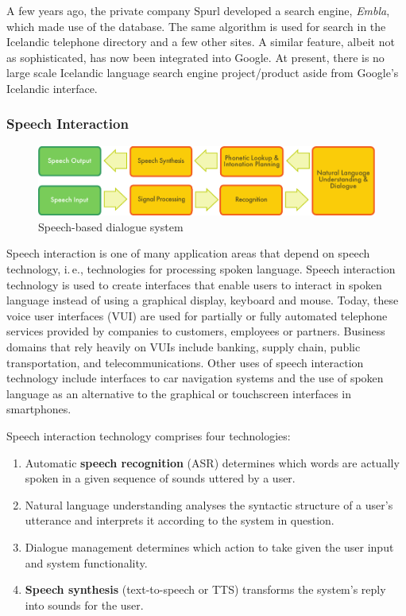 \begin{multicols}{2}
A few years ago, the private company Spurl developed a search engine, \textit{Embla}, which made use of the database. The same algorithm is used for search in the Icelandic telephone directory and a few other sites. A similar feature, albeit not as sophisticated, has now been integrated into Google. At present, there is no large scale Icelandic language search engine project/product aside from Google’s Icelandic interface.

\subsubsection{Speech Interaction}

\begin{figure}[t]
  \center
  \includegraphics[width=\textwidth]{../_media/english/simple_speech-based_dialogue_architecture}
  \caption{Speech-based dialogue system}
\label{fig:dialoguearch_en}
\end{figure}

Speech interaction is one of many application areas that depend on speech technology, i.\,e., technologies for processing spoken language. Speech interaction technology is used to create interfaces that enable users to interact in spoken language instead of using a graphical display, keyboard and mouse.  Today, these voice user interfaces (VUI) are used for partially or fully automated telephone services provided by companies to customers, employees or partners. Business domains that rely heavily on VUIs include banking, supply chain, public transportation, and telecommunications. Other uses of speech interaction technology include interfaces to car navigation systems and the use of spoken language as an alternative to the graphical or touchscreen interfaces in smartphones.

Speech interaction technology comprises four technologies: 

\begin{enumerate}
\item Automatic \textbf{speech recognition} (ASR) determines which words are actually spoken in a given sequence of sounds uttered by a user.  
\item Natural language understanding analyses the syntactic structure of a user’s utterance and interprets it according to the system in question.
\item Dialogue management determines which action to take given the user input and system functionality.   
\item \textbf{Speech synthesis} (text-to-speech or TTS) transforms the system’s reply into sounds for the user.
\end{enumerate}


\end{multicols}
